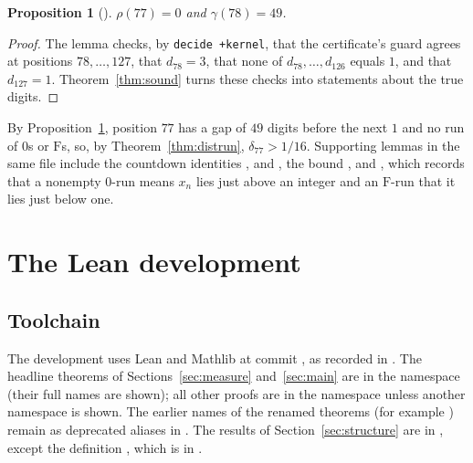 \documentclass[11pt]{amsart}
\newtheorem{proposition}[theorem]{Proposition}
\theoremstyle{definition}
\theoremstyle{remark}
\newcommand{\dist}{\delta}
\newcommand{\run}{\rho}
\newcommand{\gap}{\gamma}
\begin{document}
\begin{proposition}[]\label{prop:converse}
$\run(77)=0$ and $\gap(78)=49$.
\end{proposition}

\begin{proof}
The lemma  checks, by \mbox{\texttt{decide +kernel}}, that the
certificate's guard agrees at positions $78,\dots,127$, that $d_{78}=3$, that
none of $d_{78},\dots,d_{126}$ equals $1$, and that $d_{127}=1$.
Theorem~\ref{thm:sound} turns these checks into statements about the true
digits.
\end{proof}

By Proposition~\ref{prop:converse}, position $77$ has a gap of $49$ digits
before the next $1$ and no run of $0$s or $\mathrm{F}$s, so, by
Theorem~\ref{thm:distrun}, $\dist_{77}>1/16$. Supporting lemmas in the same file include the countdown
identities ,  and ,
the bound , and , which
records that a nonempty $0$-run means $x_n$ lies just above an integer and an
$\mathrm{F}$-run that it lies just below one.

\section{The Lean development}\label{sec:lean}

\subsection*{Toolchain}
The development uses Lean  and Mathlib at
commit , as recorded in
. The headline theorems of
Sections~\ref{sec:measure} and~\ref{sec:main} are in the namespace
 (their full names are shown); all other proofs are in the
namespace  unless another namespace is shown. The
earlier names of the renamed theorems (for example
) remain as deprecated aliases in
. The results of
Section~\ref{sec:structure} are in ,
except the definition , which is in
.
\end{document}
